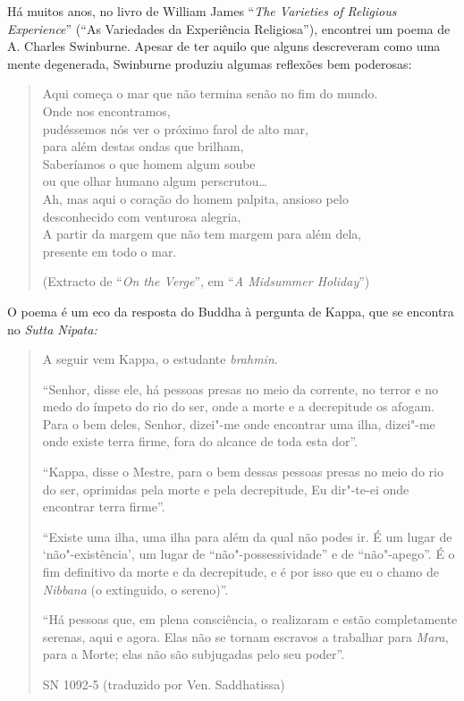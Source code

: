 Há muitos anos, no livro de William James ``\emph{The Varieties of
Religious Experience}'' (``As Variedades da Experiência
Religiosa''), encontrei um poema de A. Charles Swinburne. Apesar de ter
aquilo que alguns descreveram como uma mente degenerada, Swinburne
produziu algumas reflexões bem poderosas:

\begin{quote}
Aqui começa o mar que não termina senão no fim do mundo.\\
Onde nos encontramos,\\
pudéssemos nós ver o próximo farol de alto mar,\\
para além destas ondas que brilham,\\
Saberíamos o que homem algum soube\\
ou que olhar humano algum perscrutou\ldots{}\\
Ah, mas aqui o coração do homem palpita, ansioso pelo\\
desconhecido com venturosa alegria,\\
A partir da margem que não tem margem para além dela,\\
presente em todo o mar.

(Extracto de ``\emph{On the Verge}'', em ``\emph{A Midsummer Holiday}'')
\end{quote}

O poema é um eco da resposta do Buddha à pergunta de Kappa, que se
encontra no \emph{Sutta Nipata:}

\begin{quote}
A seguir vem Kappa, o estudante \emph{brahmin}.

``Senhor, disse ele, há pessoas presas no meio da corrente, no terror e
no medo do ímpeto do rio do ser, onde a morte e a decrepitude os afogam.
Para o bem deles, Senhor, dizei"-me onde encontrar uma ilha, dizei"-me
onde existe terra firme, fora do alcance de toda esta dor''.

``Kappa, disse o Mestre, para o bem dessas pessoas presas no meio do rio
do ser, oprimidas pela morte e pela decrepitude, Eu dir"-te-ei onde
encontrar terra firme''.

``Existe uma ilha, uma ilha para além da qual não podes ir. É um lugar
de `não"-existência', um lugar de ``não"-possessividade'' e de
``não"-apego''. É o fim definitivo da morte e da decrepitude, e é por
isso que eu o chamo de \emph{Nibbana} (o extinguido, o sereno)''.

``Há pessoas que, em plena consciência, o realizaram e estão
completamente serenas, aqui e agora. Elas não se tornam escravos a
trabalhar para \emph{Mara}, para a Morte; elas não são subjugadas pelo
seu poder''.

SN 1092-5 (traduzido por Ven. Saddhatissa)
\end{quote}

